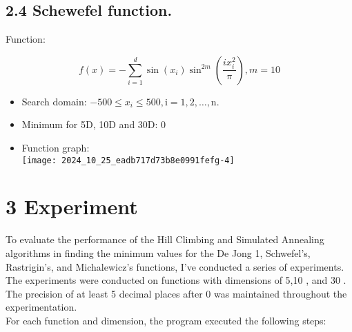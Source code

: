 \documentclass[10pt]{article}
\begin{document}
\subsection*{2.4 Schewefel function.}
Function:

$$
f(x)=-\sum_{i=1}^{d} \sin \left(x_{i}\right) \sin ^{2 m}\left(\frac{i x_{i}^{2}}{\pi}\right), m=10
$$

\begin{itemize}
  \item Search domain: $-500 \leq x_{i} \leq 500, \mathrm{i}=1,2, \ldots, \mathrm{n}$.
  \item Minimum for 5D, 10D and 30D: 0
  \item Function graph:\\
\texttt{[image: 2024\_10\_25\_eadb717d73b8e0991fefg-4]}
\end{itemize}

\section*{3 Experiment}
To evaluate the performance of the Hill Climbing and Simulated Annealing algorithms in finding the minimum values for the De Jong 1, Schwefel's, Rastrigin's, and Michalewicz's functions, I've conducted a series of experiments. The experiments were conducted on functions with dimensions of 5,10 , and 30 . The precision of at least 5 decimal places after 0 was maintained throughout the experimentation.\\
For each function and dimension, the program executed the following steps:
\end{document}
